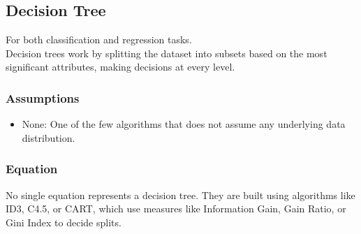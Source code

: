 \documentclass[english, threecolumn]{latex4ei/latex4ei_sheet}
\begin{document}
\begin{sectionbox}
    \subsection{Decision Tree}
For both classification and regression tasks. \\
Decision trees work by splitting the dataset into subsets based on the most significant attributes, making decisions at every level.

\subsubsection{Assumptions}
\begin{itemize}
    \item None: One of the few algorithms that does not assume any underlying data distribution.
\end{itemize}

\subsubsection{Equation}
No single equation represents a decision tree. They are built using algorithms like ID3, C4.5, or CART, which use measures like Information Gain, Gain Ratio, or Gini Index to decide splits.


\end{sectionbox}
\end{document}
